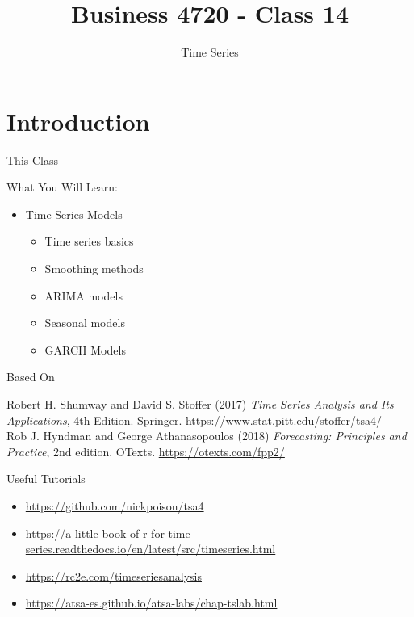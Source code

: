 \documentclass[ignorenonframetext,xcolor=x11names]{beamer}
\title{Business 4720 - Class 14}
\subtitle{Time Series}
\begin{document}
\begin{frame}{}
  \titlepage
  \footnotesize
  
\end{frame}

\section{Introduction}

\begin{frame}{This Class}

\begin{block}{What You Will Learn:}
\begin{itemize}
  \item Time Series Models
  \begin{itemize}
     \item Time series basics
     \item Smoothing methods
     \item ARIMA models
     \item Seasonal models
     \item GARCH Models
  \end{itemize}
\end{itemize}
\end{block}
\end{frame}


\begin{frame}{Based On}
\small
\begin{block}{}
Robert H. Shumway and David S. Stoffer (2017) \emph{Time Series Analysis and Its Applications}, 4th Edition. Springer. \url{https://www.stat.pitt.edu/stoffer/tsa4/} \\

\vspace{\baselineskip}
Rob J. Hyndman and George Athanasopoulos (2018) \emph{Forecasting: Principles and Practice}, 2nd edition. OTexts. \url{https://otexts.com/fpp2/} 
\end{block}

\begin{block}{Useful Tutorials}
\begin{itemize}
\item \url{https://github.com/nickpoison/tsa4}
\item \url{https://a-little-book-of-r-for-time-series.readthedocs.io/en/latest/src/timeseries.html}
\item \url{https://rc2e.com/timeseriesanalysis}
\item \url{https://atsa-es.github.io/atsa-labs/chap-tslab.html}
\end{itemize}
\end{block}

\end{frame}
\end{document}
